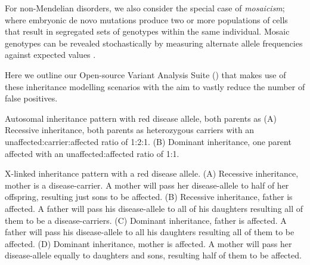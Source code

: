 For non-Mendelian disorders, we also consider the special case of \textit{mosaicism}; where embryonic de novo mutations produce two or more populations of cells that result in segregated sets of genotypes within the same individual. Mosaic genotypes can be revealed stochastically by measuring alternate allele frequencies against expected values \citep{biesecker2013genomic}.

Here we outline our Open-source Variant Analysis Suite (\app) that makes use of these inheritance modelling scenarios with the aim to vastly reduce the number of false positives.


	{Autosomal inheritance pattern with red disease allele, both parents as 
(A) Recessive inheritance, both parents as heterozygous carriers with an unaffected:carrier:affected ratio of 1:2:1.
(B) Dominant inheritance, one parent affected with an unaffected:affected ratio of 1:1.}
	
	{X-linked inheritance pattern with a red disease allele.
(A) Recessive inheritance, mother is a disease-carrier. A mother will pass her disease-allele
to half of her offspring, resulting just sons to be affected.
(B) Recessive inheritance, father is affected. A father will pass his disease-allele to all of
his daughters resulting all of them to be a disease-carriers.
(C) Dominant inheritance, father is affected. A father will pass his disease-allele to all his
daughters resulting all of them to be affected. 
(D) Dominant inheritance, mother is affected. A mother will pass her disease-allele
equally to daughters and sons, resulting half of them to be affected.}

